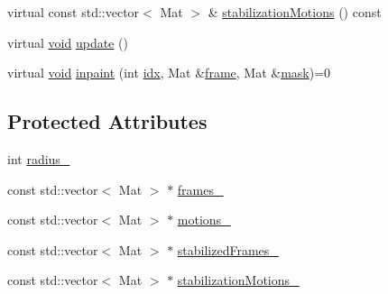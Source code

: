 \begin{DoxyCompactItemize}
\item 
virtual const std\-::vector$<$ Mat $>$ \& \hyperlink{classcv_1_1videostab_1_1InpainterBase_a66c516820f494b0cc4b8907ddfe2ff70}{stabilization\-Motions} () const 
\item 
virtual \hyperlink{legacy_8hpp_a8bb47f092d473522721002c86c13b94e}{void} \hyperlink{classcv_1_1videostab_1_1InpainterBase_ace5d3eca0056f883e5d6aafb92ef0db4}{update} ()
\item 
virtual \hyperlink{legacy_8hpp_a8bb47f092d473522721002c86c13b94e}{void} \hyperlink{classcv_1_1videostab_1_1InpainterBase_aa3a1cba9518b2afbad928859b073ad93}{inpaint} (int \hyperlink{core__c_8h_a5c7c842f447336aa2f10826df65a28b3}{idx}, Mat \&\hyperlink{core__c_8h_a0430deaafd9043e478f306e33961299d}{frame}, Mat \&\hyperlink{tracking_8hpp_a6b13ecd2fd6ec7ad422f1d7863c3ad19}{mask})=0
\end{DoxyCompactItemize}
\subsection*{Protected Attributes}
\begin{DoxyCompactItemize}
\item 
int \hyperlink{classcv_1_1videostab_1_1InpainterBase_a2300c582c556d8e74329abe28f6d08ea}{radius\-\_\-}
\item 
const std\-::vector$<$ Mat $>$ $\ast$ \hyperlink{classcv_1_1videostab_1_1InpainterBase_adc5085073fa501e61d8edfe5a34975c4}{frames\-\_\-}
\item 
const std\-::vector$<$ Mat $>$ $\ast$ \hyperlink{classcv_1_1videostab_1_1InpainterBase_a464def3695a8ef1ff91666e896ee1005}{motions\-\_\-}
\item 
const std\-::vector$<$ Mat $>$ $\ast$ \hyperlink{classcv_1_1videostab_1_1InpainterBase_a83e696d92ba2329bec22047f9298f2fb}{stabilized\-Frames\-\_\-}
\item 
const std\-::vector$<$ Mat $>$ $\ast$ \hyperlink{classcv_1_1videostab_1_1InpainterBase_ab778e2b654dbd54e36bb0aea388914ef}{stabilization\-Motions\-\_\-}
\end{DoxyCompactItemize}


